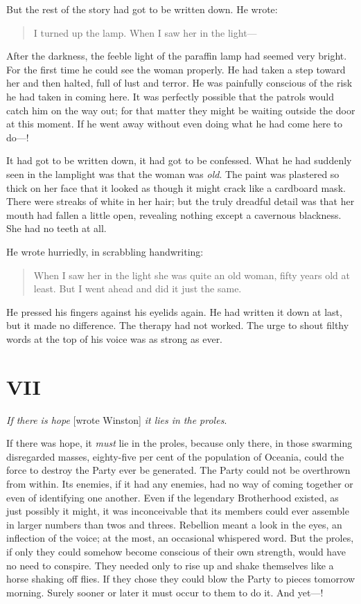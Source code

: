 But the rest of the story had got to be written down. He wrote:

\begin{quotation}
I turned up the lamp. When I saw her in the light---
\end{quotation}

After the darkness, the feeble light of the paraffin lamp had seemed
very bright. For the first time he could see the woman properly. He had
taken a step toward her and then halted, full of lust and terror. He was
painfully conscious of the risk he had taken in coming here. It was
perfectly possible that the patrols would catch him on the way out; for
that matter they might be waiting outside the door at this moment. If he
went away without even doing what he had come here to do---!

It had got to be written down, it had got to be confessed. What he had
suddenly seen in the lamplight was that the woman was \emph{old}. The
paint was plastered so thick on her face that it looked as though it
might crack like a cardboard mask. There were streaks of white in her
hair; but the truly dreadful detail was that her mouth had fallen a
little open, revealing nothing except a cavernous blackness. She had no
teeth at all.

He wrote hurriedly, in scrabbling handwriting:

\begin{quotation}
When I saw her in the light she was quite an old woman, fifty
years old at least. But I went ahead and did it just the same.
\end{quotation}

He pressed his fingers against his eyelids again. He had written it down
at last, but it made no difference. The therapy had not worked. The urge
to shout filthy words at the top of his voice was as strong as ever.


\section{VII}\label{vii}

\emph{If there is hope} [wrote Winston] \emph{it lies in the proles}.

\sectionbreak

If there was hope, it \emph{must} lie in the proles, because only there,
in those swarming disregarded masses, eighty-five per cent of the
population of Oceania, could the force to destroy the Party ever be
generated. The Party could not be overthrown from within. Its enemies,
if it had any enemies, had no way of coming together or even of
identifying one another. Even if the legendary Brotherhood existed, as
just possibly it might, it was inconceivable that its members could ever
assemble in larger numbers than twos and threes. Rebellion meant a look
in the eyes, an inflection of the voice; at the most, an occasional
whispered word. But the proles, if only they could somehow become
conscious of their own strength, would have no need to conspire. They
needed only to rise up and shake themselves like a horse shaking off
flies. If they chose they could blow the Party to pieces tomorrow
morning. Surely sooner or later it must occur to them to do it. And
yet---!


